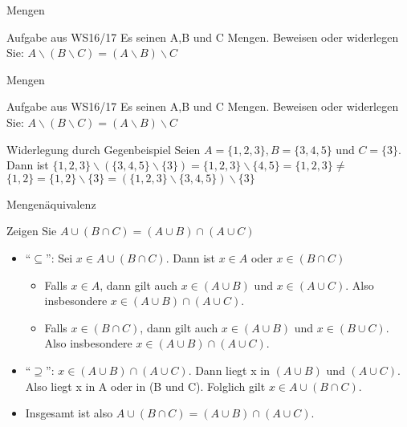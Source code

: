 \documentclass[handout]{beamer}
\begin{document}
\begin{frame}{Mengen}
	\begin{block}{Aufgabe aus WS16/17}
		Es seinen A,B und C Mengen. Beweisen oder widerlegen Sie:
		$A \backslash (B \backslash C) = (A \backslash B)\backslash C$
	\end{block}
\end{frame}
\begin{frame}{Mengen}
	\begin{block}{Aufgabe aus WS16/17}
		Es seinen A,B und C Mengen. Beweisen oder widerlegen Sie:
		$A \backslash (B \backslash C) = (A \backslash B)\backslash C$
	\end{block}
	\begin{block}{Widerlegung durch Gegenbeispiel}
		Seien $A = \{1,2,3\}, B = \{3,4,5\}$ und $C = \{3\}$.
		Dann ist $\{1,2,3\} \backslash (\{3,4,5\} \backslash \{3\}) = \{1,2,3\} \backslash \{4,5\} = \{1,2,3\} \neq$
		$\{1,2\} = \{1,2\} \backslash \{3\} = (\{1,2,3\} \backslash \{3,4,5\}) \backslash \{3\}$
	\end{block}
\end{frame}
\begin{frame}{Mengenäquivalenz}
	\begin{block}{Zeigen Sie}
		$A \cup (B \cap C) = (A \cup B) \cap (A \cup C)$
		\begin{itemize}
			\pause\item ``$\subseteq$'': Sei $x \in A \cup (B\cap C).$ Dann ist $x \in A$ oder $x \in (B \cap C)$
			\begin{itemize}
				\pause
				\item Falls $x\in A$, dann gilt auch $x\in (A\cup B)$ und $x\in (A\cup C)$. Also
				insbesondere $x\in(A\cup B)\cap(A\cup C)$.
				\pause
				\item Falls $x\in(B\cap C)$, dann gilt auch $x\in (A\cup B)$ und $x\in (B\cup C)$. Also
				insbesondere $x\in(A\cup B)\cap(A\cup C)$.
				\pause
			\end{itemize}
			\item ``$\supseteq$'': $x\in(A\cup B)\cap(A\cup C)$. Dann liegt x in $(A\cup B)$ und $(A\cup C)$.
			Also liegt x in A oder in (B und C). Folglich gilt 
			$x\in A\cup(B\cap C)$.
			\pause\item Insgesamt ist also $A\cup(B\cap C) = (A\cup B)\cap(A\cup C)$.
		\end{itemize}
	\end{block}
\end{frame}
\end{document}
